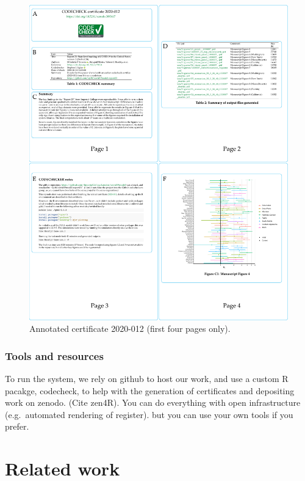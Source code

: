 \documentclass[12pt]{article}
\begin{document}
\begin{figure}
  \centering
  \includegraphics[width=\textwidth]{figs/annotate-cert-crop.pdf}
  \caption{Annotated certificate 2020-012 (first four pages only).}
  \label{fig:cert}
\end{figure}

\subsubsection*{Tools and resources}\label{tools}

To run the system, we rely on github to host our work, and use a
custom R pacakge, codecheck, to help with the generation of
certificates and depositing work on zenodo. (Cite zen4R).  You can do
everything with open infrastructure (e.g.~automated rendering of
register). but you can use your own tools if you prefer.

\section*{Related work}\label{related-work}
\end{document}
